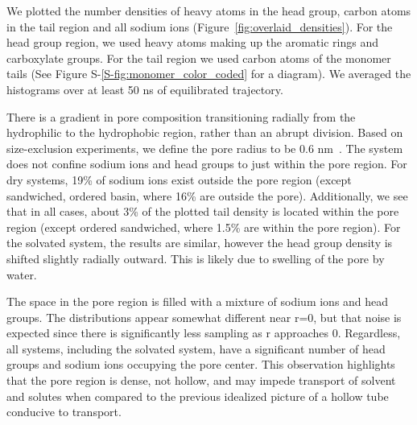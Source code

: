 \documentclass[journal=jpcbfk,manuscript=article]{achemso}
\begin{document}
  We plotted the number densities of heavy atoms in the head group, carbon atoms in the tail
  region and all sodium ions (Figure~\ref{fig:overlaid_densities}). For the head group
  region, we used heavy atoms making up the aromatic rings and carboxylate groups. For the tail
  region we used carbon atoms of the monomer tails (See Figure S-\ref{S-fig:monomer_color_coded}
  for a diagram). We averaged the histograms over at least 50 ns of equilibrated trajectory.

  There is a gradient in pore composition transitioning radially from the hydrophilic 
  to the hydrophobic region, rather than an abrupt division. Based on size-exclusion 
  experiments, we define the pore radius to be 0.6 nm~\cite{zhou_supported_2005}. 
  The system does not confine
  sodium ions and head groups to just within the pore region. For dry systems,
  19\% of sodium ions exist outside the pore region (except sandwiched, ordered basin,
  where 16\% are outside the pore). Additionally, we see that in all cases, about 
  3\% of the plotted tail density is located within the pore region (except ordered sandwiched,
  where 1.5\% are within the pore region). For the solvated system, the results are similar,
  however the head group density is shifted slightly radially outward. This is likely due to
  swelling of the pore by water. 
  

  The space in the pore region is filled with a mixture of sodium ions
  and head groups. The distributions appear somewhat different near r=0, but that noise 
  is expected since there is significantly less sampling as r approaches 0. Regardless, 
  all systems, including the solvated system, have a significant number of head groups 
  and sodium ions occupying the pore center. This observation highlights that the pore
  region is dense, not hollow, and may impede transport of solvent and solutes when
  compared to the previous idealized picture of a hollow tube conducive to transport.
  
\end{document}
